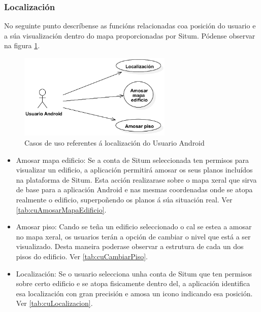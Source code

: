 \subsubsection{Localización}
No seguinte punto descríbense as funcións relacionadas coa posición do usuario e a súa visualización dentro do mapa proporcionadas por Situm. Pódense observar na figura \ref{fig:cuUsuarioAndroidPrincipalLocalizacion}.

\begin{figure}[tbp]
	\begin{center}
		\includegraphics[width=0.65\textwidth]{figures/CasosUso/UsuarioAndroidLocalizacion}
		\caption{Casos de uso referentes á localización do Usuario Android}
		\label{fig:cuUsuarioAndroidPrincipalLocalizacion}
	\end{center}
\end{figure}

\begin{itemize}
	\item Amosar mapa edificio: Se a conta de Situm seleccionada ten permisos para visualizar un edificio, a aplicación permitirá amosar os seus planos incluídos na plataforma de Situm. Esta acción realizarase sobre o mapa xeral que sirva de base para a aplicación Android e nas mesmas coordenadas onde se atopa realmente o edificio, superpoñendo os planos á súa situación real. Ver \ref{tab:cuAmosarMapaEdificio}.
	\item Amosar piso: Cando se teña un edificio seleccionado o cal se estea a amosar no mapa xeral, os usuarios terán a opción de cambiar o nivel que está a ser visualizado. Desta maneira poderase observar a estrutura de cada un dos pisos do edificio. Ver \ref{tab:cuCambiarPiso}.
	\item Localización: Se o usuario selecciona unha conta de Situm que ten permisos sobre certo edificio e se atopa fisicamente dentro del, a aplicación identifica esa localización con gran precisión e amosa un icono indicando esa posición. Ver \ref{tab:cuLocalizacion}.
\end{itemize}


